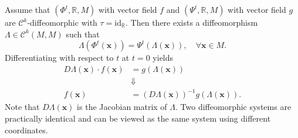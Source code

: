 \documentclass[hidelinks,a4paper, 11pt]{article}
\theoremstyle{plain}
\theoremstyle{break}
\theoremstyle{plain}
\theoremstyle{definition}
\begin{document}
Assume that $(\Phi^t, \mathbb R, M)$ with vector field $f$ and $(\Psi^t, \mathbb R, M)$ with vector field $g$ are $\mathcal C^k$-diffeomorphic with $\tau = \mathrm{id}_{\mathbb R}$. Then there exists a diffeomorphism $\Lambda \in \mathcal C^k(M,M)$ such that
\[
	\Lambda(\Phi^t(\mathbf x)) = \Psi^t(\Lambda(\mathbf x)), \quad \forall \mathbf x \in M.
\]
Differentiating with respect to $t$ at $t=0$ yields
\begin{align*}
	D\Lambda(\mathbf x)\cdot f(\mathbf x) &= g(\Lambda(\mathbf x)) \\
	&\Downarrow \\
	f(\mathbf x) &= (D\Lambda(\mathbf x))^{-1}g(\Lambda(\mathbf x)).
\end{align*}
Note that $D\Lambda(\mathbf x)$ is the Jacobian matrix of $\Lambda$. Two diffeomorphic systems are practically identical and can be viewed as the same system using different coordinates.
\end{document}
